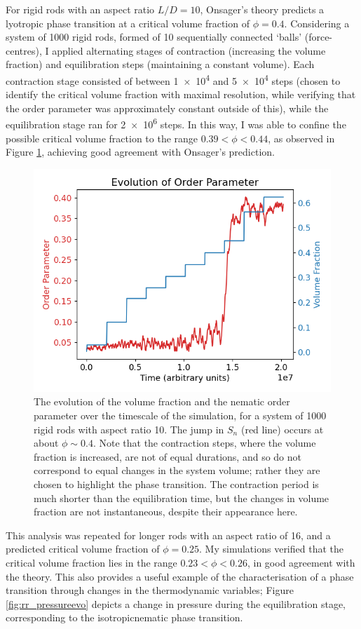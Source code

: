 \documentclass[11pt, a4paper]{article} %
\begin{document}
For rigid rods with an aspect ratio $L/D = 10$, Onsager's theory predicts a lyotropic phase transition at a critical volume fraction of $\phi  = 0.4$. Considering a system of \num{1000} rigid rods, formed of \num{10} sequentially connected `balls' (force-centres), I applied alternating stages of contraction (increasing the volume fraction) and equilibration steps (maintaining a constant volume). Each contraction stage consisted of between \num{1e4} and \num{5e4} steps (chosen to identify the critical volume fraction with maximal resolution, while verifying that the order parameter was approximately constant outside of this), while the equilibration stage ran for \num{2e6} steps. In this way, I was able to confine the possible critical volume fraction to the range $0.39 < \phi< 0.44$, as observed in Figure \ref{fig:rr_nemorderparam}, achieving good agreement with Onsager's prediction.

\begin{figure} [h!]
	\centering
	\includegraphics[width=0.7\linewidth]{Figures/rigidrod_nemorderparam}
	\caption{The evolution of the volume fraction and the nematic order parameter over the timescale of the simulation, for a system of 1000 rigid rods with aspect ratio 10. The jump in $S_n$ (red line) occurs at about $\phi \sim 0.4$. Note that the contraction steps, where the volume fraction is increased, are not of equal durations, and so do not correspond to equal changes in the system volume; rather they are chosen to highlight the phase transition. The contraction period is much shorter than the equilibration time, but the changes in volume fraction are not instantaneous, despite their appearance here.}
	\label{fig:rr_nemorderparam}
\end{figure}  %

This analysis was repeated for longer rods with an aspect ratio of \num{16}, and a predicted critical volume fraction of $\phi  = 0.25$. My simulations verified that the critical volume fraction lies in the range $0.23 < \phi< 0.26$, in good agreement with the theory. This also provides a useful example of the characterisation of a phase transition through changes in the thermodynamic variables; Figure \ref{fig:rr_pressureevo} depicts a change in pressure during the equilibration stage, corresponding to the isotropic\textendash nematic phase transition.
\end{document}
